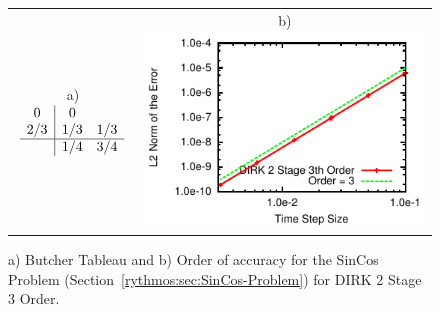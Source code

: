 \begin{figure}[H]
\centering{}%
\begin{tabular}{cc}
a)$\begin{array}{c|cc}
0 & 0\\
2/3 & 1/3 & 1/3\\
\hline  & 1/4 & 3/4
\end{array}$ & b)\includegraphics[scale=1.5]{figures/DIRK_2Stage3Order}\tabularnewline
\end{tabular}\caption{a) Butcher Tableau and b) Order of accuracy for the SinCos Problem
(Section~\ref{rythmos:sec:SinCos-Problem}) for DIRK 2 Stage 3 Order.}
\end{figure}

